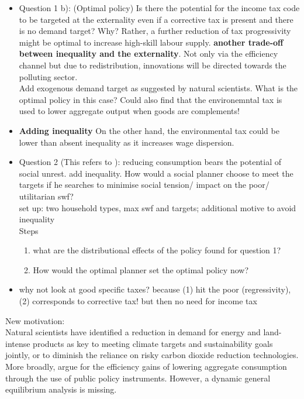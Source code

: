 \begin{itemize}
	\item Question 1 b): (Optimal policy) Is there the potential for the income tax code to be targeted at the externality even if a corrective tax is present and there is no demand target?
Why? Rather, a further reduction of tax progressivity might be optimal to increase high-skill labour supply. 
\ar \textbf{another trade-off between inequality and the externality}. Not only via the efficiency channel but due to redistribution, innovations will be directed towards the polluting sector. \\
Add exogenous demand target as suggested by natural scientists. What is the optimal policy in this case? Could also find that the environemntal tax is used to lower aggregate output when goods are complements! 

\item \textbf{Adding inequality}
On the other hand, the environmental tax could be lower than absent inequality as it increases wage dispersion. 

	\item Question 2 (This refers to \cite{Loebbing2019NationalChange}): reducing consumption bears the potential of social unrest. \ar add inequality. How would a social planner choose to meet the targets if he searches to minimise social tension/ impact on the poor/ utilitarian swf? 
	\\
	set up: two household types, max swf and targets; additional motive to avoid inequality
	\\
	Steps
	\begin{enumerate}
	\item what are the distributional effects of the policy found for question 1?
	\item How would the optimal planner set the optimal policy now? 
	\end{enumerate}
\item why not look at good specific taxes? \ar because (1) hit the poor (regressivity), (2) corresponds to corrective tax! \ar but then no need for income tax
\end{itemize}

New motivation: \\
Natural scientists have identified a reduction in demand for energy and land-intense products as key to meeting climate targets and sustainability goals jointly, or to diminish the reliance on risky carbon dioxide reduction technologies. More broadly, \cite{Arrow2004AreMuch} argue for the efficiency gains of lowering aggregate consumption through the use of public policy instruments. 
However, a dynamic general equilibrium analysis is missing. 

